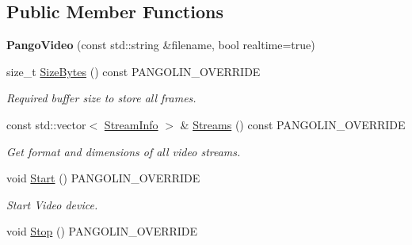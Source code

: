 \subsection*{Public Member Functions}
\begin{DoxyCompactItemize}
\item 
{\bfseries Pango\+Video} (const std\+::string \&filename, bool realtime=true)\hypertarget{classpangolin_1_1_pango_video_a835d9bf15b58320383eed6fb2aa6e8d7}{}\label{classpangolin_1_1_pango_video_a835d9bf15b58320383eed6fb2aa6e8d7}

\item 
size\+\_\+t \hyperlink{classpangolin_1_1_pango_video_aed023430933996b5202799a3405cd388}{Size\+Bytes} () const P\+A\+N\+G\+O\+L\+I\+N\+\_\+\+O\+V\+E\+R\+R\+I\+DE\hypertarget{classpangolin_1_1_pango_video_aed023430933996b5202799a3405cd388}{}\label{classpangolin_1_1_pango_video_aed023430933996b5202799a3405cd388}

\begin{DoxyCompactList}\small\item\em Required buffer size to store all frames. \end{DoxyCompactList}\item 
const std\+::vector$<$ \hyperlink{classpangolin_1_1_stream_info}{Stream\+Info} $>$ \& \hyperlink{classpangolin_1_1_pango_video_a082c8deeda9600e96326eb6a312af11b}{Streams} () const P\+A\+N\+G\+O\+L\+I\+N\+\_\+\+O\+V\+E\+R\+R\+I\+DE\hypertarget{classpangolin_1_1_pango_video_a082c8deeda9600e96326eb6a312af11b}{}\label{classpangolin_1_1_pango_video_a082c8deeda9600e96326eb6a312af11b}

\begin{DoxyCompactList}\small\item\em Get format and dimensions of all video streams. \end{DoxyCompactList}\item 
void \hyperlink{classpangolin_1_1_pango_video_abc5f6c2942f1b7d946b67b411d82e682}{Start} () P\+A\+N\+G\+O\+L\+I\+N\+\_\+\+O\+V\+E\+R\+R\+I\+DE\hypertarget{classpangolin_1_1_pango_video_abc5f6c2942f1b7d946b67b411d82e682}{}\label{classpangolin_1_1_pango_video_abc5f6c2942f1b7d946b67b411d82e682}

\begin{DoxyCompactList}\small\item\em Start Video device. \end{DoxyCompactList}\item 
void \hyperlink{classpangolin_1_1_pango_video_a7978def8e5f13fff25225a045721f898}{Stop} () P\+A\+N\+G\+O\+L\+I\+N\+\_\+\+O\+V\+E\+R\+R\+I\+DE\hypertarget{classpangolin_1_1_pango_video_a7978def8e5f13fff25225a045721f898}{}\label{classpangolin_1_1_pango_video_a7978def8e5f13fff25225a045721f898}


\end{DoxyCompactItemize}
